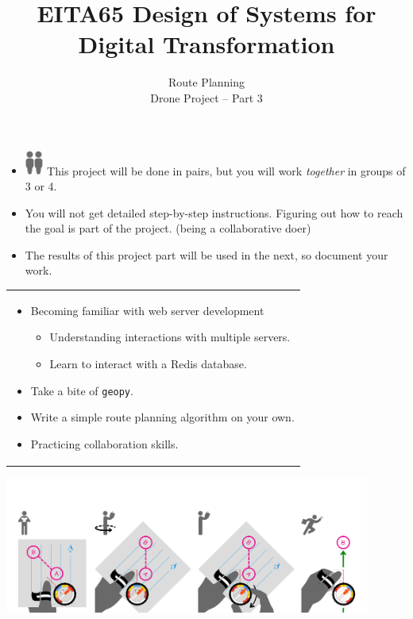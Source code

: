 \documentclass{article}
\title{EITA65 Design of Systems for Digital Transformation\\\year}
\author{\huge Route Planning\\Drone Project -- Part 3}
\begin{document}
\clearpage\maketitle
\thispagestyle{empty}%

\begin{itemize}
\item \includegraphics[width=3mm]{person.png}\includegraphics[width=3mm]{person.png} This project will be done in pairs, but you will work \textit{together} in groups of 3 or 4.
\item You will not get detailed step-by-step instructions. Figuring out how to reach the goal is part of the project. (being a collaborative doer)
\item The results of this project part will be used in the next, so document your work.
\end{itemize}

\vspace{.1cm}
\begin{center}
\begin{tabular}{l}
\toprule[1.5pt]
\parbox{0.8\linewidth}{
\vspace{.2cm}{\Large Learning goals:}
\begin{itemize}
\item Becoming familiar with web server development
  \begin{itemize}
  \item Understanding interactions with multiple servers.
  \item Learn to interact with a Redis database. 
  \end{itemize}
\item Take a bite of \texttt{geopy}.
\item Write a simple route planning algorithm on your own.
\item Practicing collaboration skills.
\end{itemize}}\\
\bottomrule[1.5pt]
\end{tabular}
\end{center}
\vfill
\begin{center}
\includegraphics[width=120mm]{orienteering.png}
\end{center}
\vspace{2cm}
\end{document}
